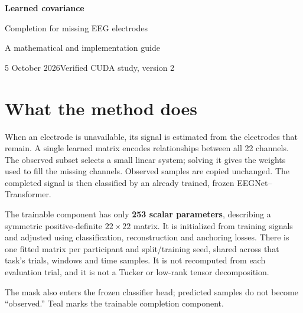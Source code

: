 \documentclass[11pt,a4paper]{article}
\begin{document}
\thispagestyle{empty}
{\Huge\bfseries\color{navy} Learned covariance}\par\vspace{3pt}
{\LARGE\color{navy} Completion for missing EEG electrodes}\par\vspace{8pt}
{\large A mathematical and implementation guide}\par\vspace{4pt}
5 October 2026\quad\textbullet\quad Verified CUDA study, version 2

\section{What the method does}
When an electrode is unavailable, its signal is estimated from the electrodes
that remain. A single learned matrix encodes relationships between all 22
channels. The observed subset selects a small linear system; solving it gives
the weights used to fill the missing channels. Observed samples are copied
unchanged. The completed signal is then classified by an already trained,
frozen EEGNet--Transformer.

The trainable component has only \textbf{253 scalar parameters}, describing a
symmetric positive-definite $22\times22$ matrix. It is initialized from training
signals and adjusted using classification, reconstruction and anchoring losses.
There is one fitted matrix per participant and split/training seed, shared across
that task's trials, windows and time samples. It is not recomputed from each
evaluation trial, and it is not a Tucker or low-rank tensor decomposition.

\begin{center}
\end{center}
{\small The mask also enters the frozen classifier head; predicted samples do not
become ``observed.'' Teal marks the trainable completion component.}
\end{document}
